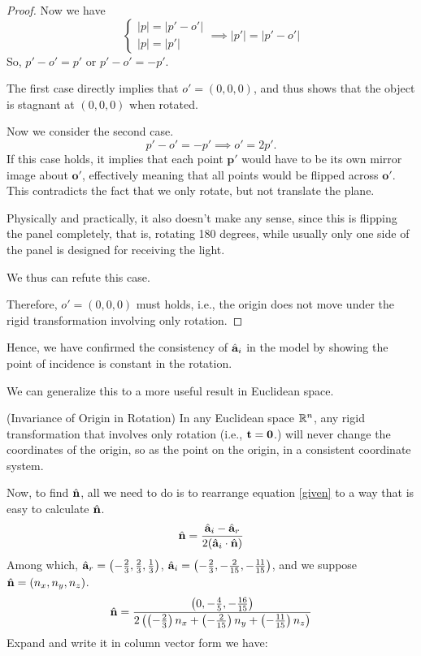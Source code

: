 \documentclass[12pt,a4paper]{article}
\begin{document}
\begin{solution}
\begin{remark}
\begin{proof}
    Now we have
    $$
    \begin{cases}
        |p| = |p'- o'|\\ 
        |p| = |p'|
    \end{cases}
    \implies 
    |p'| = |p'- o'|
    $$
    So, $p' - o' = p'$ or $p' - o' = -p'$.

    The first case directly implies that $o' = (0,0,0)$, and thus shows that the object is stagnant at $(0,0,0)$ when rotated.

    Now we consider the second case.
     \[
    {p'} - {o'} = -{p'} \implies {o'} = 2{p'}.
    \]
    If this case holds, it implies that each point \( \mathbf{p'} \) would have to be its own mirror image about \( \mathbf{o'} \), effectively meaning that all points would be flipped across \( \mathbf{o'} \). This contradicts the fact that we only rotate, but not translate the plane. 
    \begin{note}
        Physically and practically, it also doesn't make any sense, since this is flipping the panel completely, that is, rotating 180 degrees, while usually only one side of the panel is designed for receiving the light.
    \end{note}
    We thus can refute this case.

    Therefore, $o' = (0,0,0)$ must holds, i.e., the origin does not move under the rigid transformation involving only rotation.
\end{proof}
   Hence, we have confirmed the consistency of $\hat{\mathbf{a}}_i$ in the model by showing the point of incidence is constant in the rotation.


We can generalize this to a more useful result in Euclidean space.
\begin{corollary}(Invariance of Origin in Rotation)
    In any Euclidean space $\mathbb{R}^n$, any rigid transformation that involves only rotation (i.e., $\mathbf{t} = \mathbf{0}$.) will never change the coordinates of the origin, so as the point on the origin, in a consistent coordinate system.
\end{corollary}
\end{remark}

Now, to find $\hat{\mathbf{n}}$, all we need to do is to rearrange equation \ref{given}
to a way that is easy to calculate $\hat{\mathbf{n}}$.
\begin{equation}
\hat{\mathbf{n}} = \frac{\hat{\mathbf{a}}_i - \hat{\mathbf{a}}_r}{2 (\hat{\mathbf{a}}_i \cdot \hat{\mathbf{n}})}
\end{equation}
Among which, $\hat{\mathbf{a}}_r = \left(-\frac{2}{3}, \frac{2}{3}, \frac{1}{3} \right)$, $\hat{\mathbf{a}}_i = \left( -\frac{2}{3}, -\frac{2}{15}, -\frac{11}{15} \right)$, and we suppose $\hat{\mathbf{n}} = (n_x, n_y, n_z)$.
\begin{equation}
\hat{\mathbf{n}} = \frac{\left( 0, -\frac{4}{5}, -\frac{16}{15} \right)}{2 \left( \left( -\frac{2}{3} \right) n_x + \left( -\frac{2}{15} \right) n_y + \left( -\frac{11}{15} \right) n_z \right)}
\end{equation}
Expand and write it in column vector form we have:


\end{solution}
\end{document}
